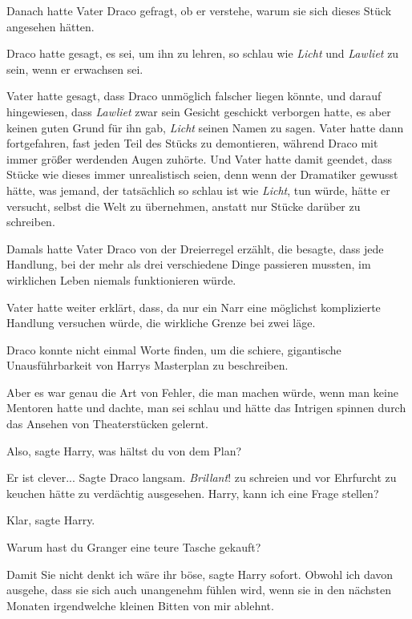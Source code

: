 Danach hatte Vater Draco gefragt, ob er verstehe, warum sie sich dieses Stück
angesehen hätten.

Draco hatte gesagt, es sei, um ihn zu lehren, so schlau wie \emph{Licht} und
\emph{Lawliet} zu sein, wenn er erwachsen sei.

Vater hatte gesagt, dass Draco unmöglich falscher liegen könnte, und darauf
hingewiesen, dass \emph{Lawliet} zwar sein Gesicht geschickt verborgen hatte, es
aber keinen guten Grund für ihn gab, \emph{Licht} seinen Namen zu sagen. Vater
hatte dann fortgefahren, fast jeden Teil des Stücks zu demontieren, während
Draco mit immer größer werdenden Augen zuhörte. Und Vater hatte damit geendet,
dass Stücke wie dieses immer unrealistisch seien, denn wenn der Dramatiker
gewusst hätte, was jemand, der tatsächlich so schlau ist wie \emph{Licht}, tun
würde, hätte er versucht, selbst die Welt zu übernehmen, anstatt nur Stücke
darüber zu schreiben.

Damals hatte Vater Draco von der Dreierregel erzählt, die besagte, dass jede
Handlung, bei der mehr als drei verschiedene Dinge passieren mussten, im
wirklichen Leben niemals funktionieren würde.

Vater hatte weiter erklärt, dass, da nur ein Narr eine möglichst komplizierte
Handlung versuchen würde, die wirkliche Grenze bei zwei läge.

Draco konnte nicht einmal Worte finden, um die schiere, gigantische
Unausführbarkeit von Harrys Masterplan zu beschreiben.

Aber es war genau die Art von Fehler, die man machen würde, wenn man keine
Mentoren hatte und dachte, man sei schlau und hätte das Intrigen spinnen durch
das Ansehen von Theaterstücken gelernt.

\glqq{}Also\grqq{}, sagte Harry, \glqq{}was hältst du von dem Plan?\grqq{}

\glqq{}Er ist clever...\grqq{} Sagte Draco langsam. \emph{Brillant}! zu schreien
und vor Ehrfurcht zu keuchen hätte zu verdächtig ausgesehen. \glqq{}Harry, kann
ich eine Frage stellen?\grqq{}

\glqq{}Klar\grqq{}, sagte Harry.

\glqq{}Warum hast du Granger eine teure Tasche gekauft?\grqq{}

\glqq{}Damit Sie nicht denkt ich wäre ihr böse\grqq{}, sagte Harry sofort. \glqq{}
Obwohl ich davon ausgehe, dass sie sich auch unangenehm fühlen wird, wenn sie in
den nächsten Monaten irgendwelche kleinen Bitten von mir ablehnt.\grqq{}

